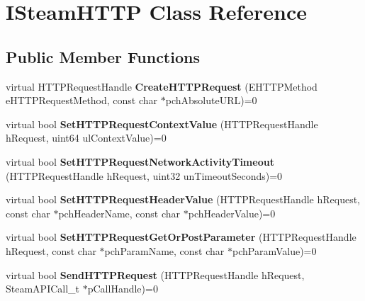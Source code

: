 \hypertarget{classISteamHTTP}{}\section{I\+Steam\+H\+T\+T\+P Class Reference}
\label{classISteamHTTP}
\subsection*{Public Member Functions}
\begin{DoxyCompactItemize}
\item 
\hypertarget{classISteamHTTP_acaee24bdd93444e497f810d7ccb36329}{}virtual H\+T\+T\+P\+Request\+Handle {\bfseries Create\+H\+T\+T\+P\+Request} (E\+H\+T\+T\+P\+Method e\+H\+T\+T\+P\+Request\+Method, const char $\ast$pch\+Absolute\+U\+R\+L)=0\label{classISteamHTTP_acaee24bdd93444e497f810d7ccb36329}

\item 
\hypertarget{classISteamHTTP_a5d37146c40c7bb8c20ff6ca2b89e7a05}{}virtual bool {\bfseries Set\+H\+T\+T\+P\+Request\+Context\+Value} (H\+T\+T\+P\+Request\+Handle h\+Request, uint64 ul\+Context\+Value)=0\label{classISteamHTTP_a5d37146c40c7bb8c20ff6ca2b89e7a05}

\item 
\hypertarget{classISteamHTTP_a6c1a701435ae6dac27d0d81a18c05094}{}virtual bool {\bfseries Set\+H\+T\+T\+P\+Request\+Network\+Activity\+Timeout} (H\+T\+T\+P\+Request\+Handle h\+Request, uint32 un\+Timeout\+Seconds)=0\label{classISteamHTTP_a6c1a701435ae6dac27d0d81a18c05094}

\item 
\hypertarget{classISteamHTTP_a7e5df5305240444c368afbc4ba2e3a4b}{}virtual bool {\bfseries Set\+H\+T\+T\+P\+Request\+Header\+Value} (H\+T\+T\+P\+Request\+Handle h\+Request, const char $\ast$pch\+Header\+Name, const char $\ast$pch\+Header\+Value)=0\label{classISteamHTTP_a7e5df5305240444c368afbc4ba2e3a4b}

\item 
\hypertarget{classISteamHTTP_a87eb32d1aafb3c213b4e33b704c8e3de}{}virtual bool {\bfseries Set\+H\+T\+T\+P\+Request\+Get\+Or\+Post\+Parameter} (H\+T\+T\+P\+Request\+Handle h\+Request, const char $\ast$pch\+Param\+Name, const char $\ast$pch\+Param\+Value)=0\label{classISteamHTTP_a87eb32d1aafb3c213b4e33b704c8e3de}

\item 
\hypertarget{classISteamHTTP_a17cf6ae31cbf24b7767689574cd3bb57}{}virtual bool {\bfseries Send\+H\+T\+T\+P\+Request} (H\+T\+T\+P\+Request\+Handle h\+Request, Steam\+A\+P\+I\+Call\+\_\+t $\ast$p\+Call\+Handle)=0\label{classISteamHTTP_a17cf6ae31cbf24b7767689574cd3bb57}


\end{DoxyCompactItemize}
